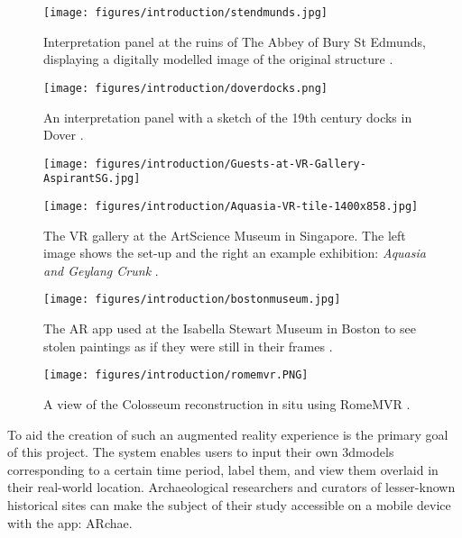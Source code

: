 \documentclass[12pt, a4paper]{article}
\begin{document}
\begin{figure}
\centering
    \texttt{[image: figures/introduction/stendmunds.jpg]}
    \caption{Interpretation panel at the ruins of The Abbey of Bury St Edmunds, displaying a digitally modelled image of the original structure \cite{preface:bury}.}
    \label{fig:stedmundschurch}
\end{figure}

\begin{figure}
    \centering
    \texttt{[image: figures/introduction/doverdocks.png]}
    \caption{An interpretation panel with a sketch of the 19th century docks in Dover \cite{preface:dover}.}
    \label{fig:iloveyoubryce}
\end{figure}

\begin{figure}[]
\centering
\begin{minipage}{.5\textwidth}
  \centering
  \texttt{[image: figures/introduction/Guests-at-VR-Gallery-AspirantSG.jpg]}
\end{minipage}%
\begin{minipage}{.5\textwidth}
  \centering
  \texttt{[image: figures/introduction/Aquasia-VR-tile-1400x858.jpg]}
\end{minipage}
\caption{The VR gallery at the ArtScience Museum in Singapore. The left image shows the set-up and the right an example exhibition: \textit{Aquasia and Geylang Crunk} \cite{preface:artscience}.}
\label{fig:singaporeartsci}
\end{figure}

\begin{figure}
    \centering
    \texttt{[image: figures/introduction/bostonmuseum.jpg]}
    \caption{The AR app used at the Isabella Stewart Museum in Boston to see stolen paintings as if they were still in their frames \cite{preface:bostommuseum}.}
    \label{fig:bostonmuseum}
\end{figure}

\begin{figure}
    \centering
    \texttt{[image: figures/introduction/romemvr.PNG]}
    \caption{A view of the Colosseum reconstruction in situ using RomeMVR \cite{existing:romemvr}.}
    \label{fig:romemv2intro}
\end{figure}

To aid the creation of such an augmented reality experience is the primary goal of this project. The system enables users to input their own \gls{3dmodel}s corresponding to a certain time period, label them, and view them overlaid in their real-world location. Archaeological researchers and curators of lesser-known historical sites can make the subject of their study accessible on a mobile device with the app: ARchae. 
\end{document}
